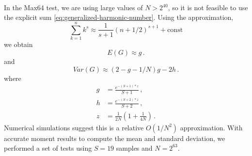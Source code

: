 In the Max64 test, we are using large values of $N > 2^{40}$, so it is not feasible to use the explicit sum \ref{eq:generalized-harmonic-number}.  Using the approximation,
\begin{equation}
\sum_{k=1}^{n} k^s \approx \frac{1}{s+1} (n+1/2)^{s+1} + \text{const}
\end{equation}
we obtain
\begin{equation}
E(G) \approx g \,.
\end{equation}
and
\begin{equation}
Var(G) \approx (2-g-1/N)g -2h \,.
\end{equation}
where
\begin{align}
g &= \frac{e^{-(S+1)*z}}{S+1} \,, \\
h &= \frac{e^{-(S+2)*z}}{S+2} \,, \\
z &= \frac{1}{2N} \left(1+\frac{1}{4N}\right) \,.
\end{align}
Numerical simulations suggest this is a relative $O(1/N^2)$ approximation.  With accurate moment results to compute the mean and standard deviation, we performed a set of tests using $S=19$ samples and $N=2^{63}$.

